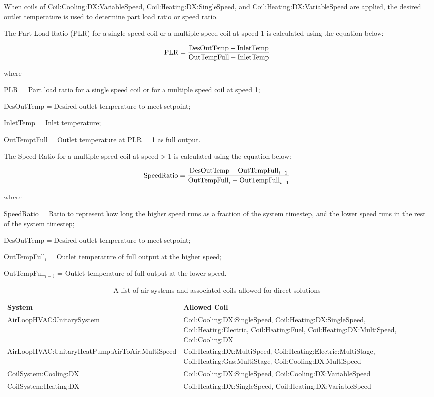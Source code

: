 When coils of Coil:Cooling:DX:VariableSpeed, Coil:Heating:DX:SingleSpeed, and Coil:Heating:DX:VariableSpeed are applied, the desired outlet temperature is used to determine part load ratio or speed ratio.

The Part Load Ratio (PLR) for a single speed coil or a multiple speed coil at speed 1 is calculated using the equation below:

\begin{equation}
\textnormal{PLR} = \frac{\textnormal{DesOutTemp} - \textnormal{InletTemp}}{\textnormal{OutTempFull} - \textnormal{InletTemp}}
\end{equation}

where

PLR = Part load ratio for a single speed coil or for a multiple speed coil at speed 1;

DesOutTemp = Desired outlet temperature to meet setpoint;

InletTemp = Inlet temperature;

OutTemptFull = Outlet temperature at PLR = 1 as full output.

The Speed Ratio for a multiple speed coil at speed > 1 is calculated using the equation below:

\begin{equation}
\textnormal{SpeedRatio} = \frac{\textnormal{DesOutTemp} - \textnormal{OutTempFull}_{i-1}}{\textnormal{OutTempFull}_{i} - \textnormal{OutTempFull}_{i-1}}
\end{equation}

where

SpeedRatio = Ratio to represent how long the higher speed runs as a fraction of the system timestep, and the lower speed runs in the rest of the system timestep;

DesOutTemp = Desired outlet temperature to meet setpoint;

OutTempFull$_{i}$ = Outlet temperature of full output at the higher speed;

OutTempFull$_{i-1}$ = Outlet temperature of full output at the lower speed.

\begin{longtable}[c]{p{4in}p{2.5in}}
\caption{A list of air systems and associated coils allowed for direct solutions\label{table:a_list_of_air_systems_and_associated_coils_allowed_for_direct solutions}} \tabularnewline
\toprule
System & Allowed Coil \tabularnewline
\midrule
\endfirsthead

AirLoopHVAC:UnitarySystem & Coil:Cooling:DX:SingleSpeed, Coil:Heating:DX:SingleSpeed, Coil:Heating:Electric, Coil:Heating:Fuel,  Coil:Heating:DX:MultiSpeed, Coil:Cooling:DX\tabularnewline
AirLoopHVAC:UnitaryHeatPump:AirToAir:MultiSpeed & Coil:Heating:DX:MultiSpeed, Coil:Heating:Electric:MultiStage, Coil:Heating:Gas:MultiStage, Coil:Cooling:DX:MultiSpeed\tabularnewline
CoilSystem:Cooling:DX & Coil:Cooling:DX:SingleSpeed, Coil:Cooling:DX:VariableSpeed \tabularnewline
CoilSystem:Heating:DX & Coil:Heating:DX:SingleSpeed, Coil:Heating:DX:VariableSpeed \tabularnewline

\bottomrule
\end{longtable}

